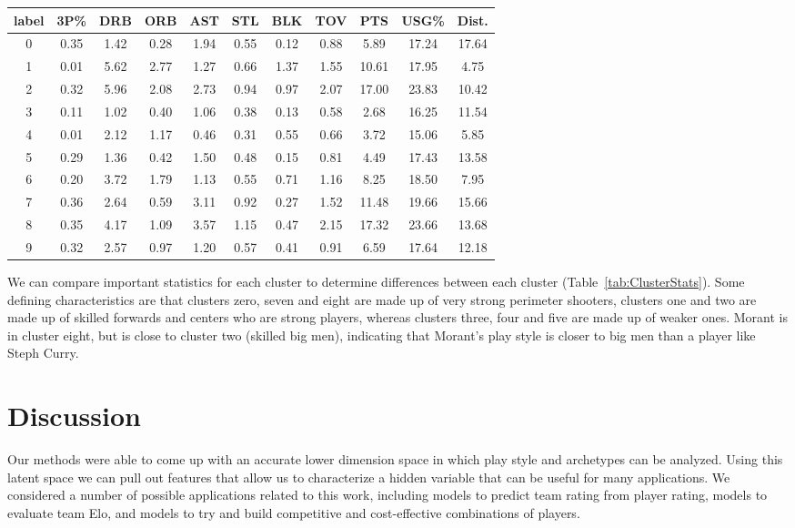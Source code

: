 \documentclass[12pt, letterpaper, titlepage]{article}
\begin{document}
\begin{tabular}{ccccccccccc}
    \label{tab:ClusterStats}
    \textbf{label} & \textbf{3P\%} & \textbf{DRB} & \textbf{ORB} & \textbf{AST} & \textbf{STL} & \textbf{BLK} & \textbf{TOV} & \textbf{PTS} & \textbf{USG\%} & \textbf{Dist.} \\
    \hline
    0 & 0.35 & 1.42 & 0.28 & 1.94 & 0.55 & 0.12 & 0.88 & 5.89 & 17.24 & 17.64 \\
    1 & 0.01 & 5.62 & 2.77 & 1.27 & 0.66 & 1.37 & 1.55 & 10.61 & 17.95 & 4.75 \\
    2 & 0.32 & 5.96 & 2.08 & 2.73 & 0.94 & 0.97 & 2.07 & 17.00 & 23.83 & 10.42 \\
    3 & 0.11 & 1.02 & 0.40 & 1.06 & 0.38 & 0.13 & 0.58 & 2.68 & 16.25 & 11.54 \\
    4 & 0.01 & 2.12 & 1.17 & 0.46 & 0.31 & 0.55 & 0.66 & 3.72 & 15.06 & 5.85 \\
    5 & 0.29 & 1.36 & 0.42 & 1.50 & 0.48 & 0.15 & 0.81 & 4.49 & 17.43 & 13.58 \\
    6 & 0.20 & 3.72 & 1.79 & 1.13 & 0.55 & 0.71 & 1.16 & 8.25 & 18.50 & 7.95 \\
    7 & 0.36 & 2.64 & 0.59 & 3.11 & 0.92 & 0.27 & 1.52 & 11.48 & 19.66 & 15.66 \\
    8 & 0.35 & 4.17 & 1.09 & 3.57 & 1.15 & 0.47 & 2.15 & 17.32 & 23.66 & 13.68 \\
    9 & 0.32 & 2.57 & 0.97 & 1.20 & 0.57 & 0.41 & 0.91 & 6.59 & 17.64 & 12.18 \\
    \end{tabular}

 We can compare important statistics for each cluster to determine differences between each cluster (Table~\ref{tab:ClusterStats}).  Some defining characteristics are that clusters zero, seven and eight are made up of very strong perimeter shooters, clusters one and two are made up of skilled forwards and centers who are strong players, whereas clusters three, four and five are made up of weaker ones. Morant is in cluster eight, but is close to cluster two (skilled big men), indicating that Morant's play style is closer to big men than a player like Steph Curry.
\section{Discussion}



Our methods were able to come up with an accurate lower dimension space in which play style and archetypes can be analyzed.  Using this latent space we can pull out features that allow us to characterize a hidden variable that can be useful for many applications.  We considered a number of possible applications related to this work, including models to predict team rating from player rating, models to evaluate team Elo, and models to try and build competitive and cost-effective combinations of players.  
\end{document}
